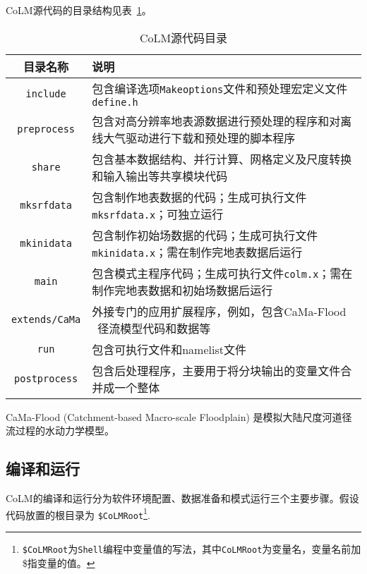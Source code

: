 CoLM源代码的目录结构见表~\ref{subdirectories}。
\begin{table}[!htbp]\small
\caption{CoLM源代码目录} \label{subdirectories}
\centering \renewcommand{\arraystretch}{1.5}
\begin{threeparttable}
\begin{tabular}{cp{}}
\toprule
\textbf{目录名称} & \textbf{说明} \\
\midrule
\texttt{include} & 包含编译选项\texttt{Makeoptions}文件和预处理宏定义文件\texttt{define.h} \\
\texttt{preprocess} & 包含对高分辨率地表源数据进行预处理的程序和对离线大气驱动进行下载和预处理的脚本程序 \\
\texttt{share} & 包含基本数据结构、并行计算、网格定义及尺度转换和输入输出等共享模块代码 \\
\texttt{mksrfdata} & 包含制作地表数据的代码；生成可执行文件\texttt{mksrfdata.x}；可独立运行 \\
\texttt{mkinidata} & 包含制作初始场数据的代码；生成可执行文件\texttt{mkinidata.x}；需在制作完地表数据后运行\\
\texttt{main} & 包含模式主程序代码；生成可执行文件\texttt{colm.x}；需在制作完地表数据和初始场数据后运行\\
\texttt{extends/CaMa} & 外接专门的应用扩展程序，例如，包含CaMa-Flood\tnote{1} ~径流模型代码和数据等 \\
\texttt{run} & 包含可执行文件和namelist文件 \\
\texttt{postprocess} & 包含后处理程序，主要用于将分块输出的变量文件合并成一个整体 \\
\bottomrule
\end{tabular}
\begin{tablenotes}
\footnotesize
\item[1] CaMa-Flood (Catchment-based Macro-scale Floodplain) 是模拟大陆尺度河道径流过程的水动力学模型。
\end{tablenotes} 
\end{threeparttable}
\end{table}

\subsection{编译和运行}\label{comprun}

CoLM的编译和运行分为软件环境配置、数据准备和模式运行三个主要步骤。假设代码放置的根目录为 \texttt{\$CoLMRoot}\footnote{\texttt{\$CoLMRoot}为\texttt{Shell}编程中变量值的写法，其中\texttt{CoLMRoot}为变量名，变量名前加\$指变量的值。}.


